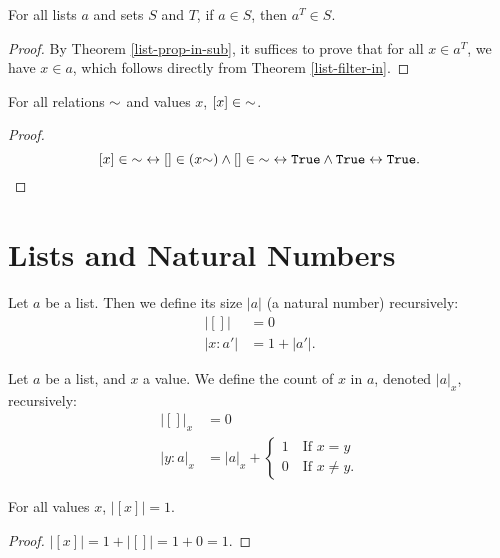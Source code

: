 \documentclass[../math.tex]{subfiles}
\begin{document}
\begin{theorem} \label{list-prop-other-filter}
    For all lists $a$ and sets $S$ and $T$, if $a \in S$, then $a^T \in S$.
\end{theorem}
\begin{proof}
    By Theorem \ref{list-prop-in-sub}, it suffices to prove that for all $x \in
    a^T$, we have $x \in a$, which follows directly from Theorem
    \ref{list-filter-in}.
\end{proof}

\begin{theorem} \label{list-prop2-single}
    For all relations ${\sim}$ and values $x$, $[x] \in {\sim}$.
\end{theorem}
\begin{proof}
    \[
        [x] \in \usim
        \leftrightarrow [] \in (x\usim) \wedge [] \in \usim
        \leftrightarrow \vtt{True} \wedge \vtt{True}
        \leftrightarrow \vtt{True}.
    \]
\end{proof}

\section{Lists and Natural Numbers}

\begin{definition}
    Let $a$ be a list.  Then we define its size $|a|$ (a natural number)
    recursively:
    \begin{align*}
            |[]| &= 0 \\
        |x : a'| &= 1 + |a'|.
    \end{align*}
\end{definition}

\begin{definition}
    Let $a$ be a list, and $x$ a value.  We define the count of $x$ in $a$,
    denoted $|a|_x$, recursively:
    \begin{align*}
           |[]|_x &= 0 \\
        |y : a|_x &= |a|_x + \begin{cases}
            1 \quad \text{If $x = y$} \\
            0 \quad \text{If $x \neq y$}.
        \end{cases}
    \end{align*}
\end{definition}

\begin{theorem}
    For all values $x$, $|[x]| = 1$.
\end{theorem}
\begin{proof}
    $|[x]| = 1 + |[]| = 1 + 0 = 1$.
\end{proof}
\end{document}
